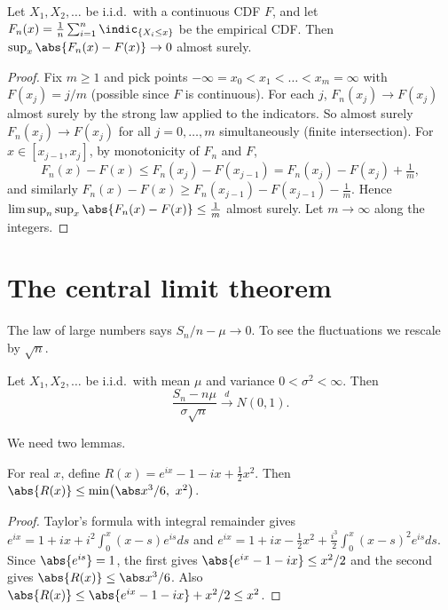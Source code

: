 \begin{theorem}\label{thm:gc}
Let $X_1,X_2,\dots$ be i.i.d.\ with a continuous CDF $F$, and let
$F_n(x)=\frac1n\sum_{i=1}^n\indic_{\{X_i\le x\}}$ be the empirical CDF. Then
$\sup_x\abs{F_n(x)-F(x)}\to0$ almost surely.
\end{theorem}
\begin{proof}
Fix $m\ge1$ and pick points $-\infty=x_0<x_1<\dots<x_m=\infty$ with $F(x_j)=j/m$
(possible since $F$ is continuous). For each $j$, $F_n(x_j)\to F(x_j)$ almost surely by
the strong law applied to the indicators. So almost surely $F_n(x_j)\to F(x_j)$ for
all $j=0,\dots,m$ simultaneously (finite intersection). For $x\in[x_{j-1},x_j]$, by
monotonicity of $F_n$ and $F$,
\[
F_n(x)-F(x)\le F_n(x_j)-F(x_{j-1})=F_n(x_j)-F(x_j)+\tfrac1m,
\]
and similarly $F_n(x)-F(x)\ge F_n(x_{j-1})-F(x_{j-1})-\tfrac1m$. Hence
$\limsup_n\sup_x\abs{F_n(x)-F(x)}\le\tfrac1m$ almost surely. Let $m\to\infty$ along
the integers.
\end{proof}

\section{The central limit theorem}

The law of large numbers says $S_n/n-\mu\to0$. To see the fluctuations we rescale
by $\sqrt n$.

\begin{theorem}\label{thm:clt}
Let $X_1,X_2,\dots$ be i.i.d.\ with mean $\mu$ and variance $0<\sigma^2<\infty$. Then
\[
\frac{S_n-n\mu}{\sigma\sqrt n}\xrightarrow{d}N(0,1).
\]
\end{theorem}

We need two lemmas.

\begin{lemma}\label{lem:taylor}
For real $x$, define $R(x)=e^{ix}-1-ix+\tfrac12x^2$. Then
$\abs{R(x)}\le\min\bigl(\abs x^3/6,\ x^2\bigr)$.
\end{lemma}
\begin{proof}
Taylor's formula with integral remainder gives
$e^{ix}=1+ix+i^2\int_0^x(x-s)e^{is}ds$ and
$e^{ix}=1+ix-\tfrac12x^2+\frac{i^3}2\int_0^x(x-s)^2e^{is}ds$. Since $\abs{e^{is}}=1$,
the first gives $\abs{e^{ix}-1-ix}\le x^2/2$ and the second gives
$\abs{R(x)}\le\abs x^3/6$. Also
$\abs{R(x)}\le\abs{e^{ix}-1-ix}+x^2/2\le x^2$.
\end{proof}

